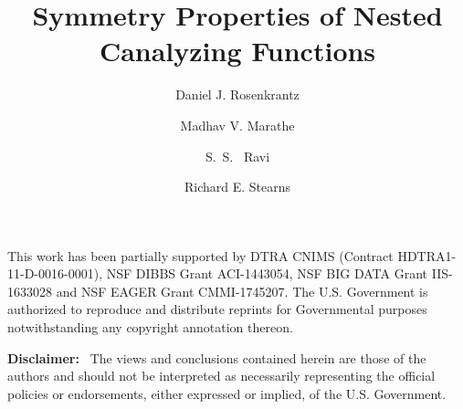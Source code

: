 \documentclass[
submission
]{dmtcs-episciences}
\author{Daniel J. Rosenkrantz\affiliationmark{1}
  \and Madhav V. Marathe\affiliationmark{2}%
  \and S.~S.~ Ravi\affiliationmark{1}%
  \and Richard E. Stearns\affiliationmark{1}
}
\title[Symmetry and NCFs]
      {Symmetry Properties of Nested Canalyzing Functions}
\affiliation{
  Biocomplexity Institute and Initiative, University of Virginia and
  Department of Computer Science, University at Albany 
  -- State University of New York, USA\\
  Biocomplexity Institute and Initiative \& Department of 
  Computer Science, University of Virginia, USA
}
\begin{document}
\maketitle




\newcommand{\QED}{\hfill\rule{2mm}{2mm}}

\newcommand{\cpoly}{\textbf{P}}
\newcommand{\cnp}{\textbf{NP}}
\newcommand{\cnump}{\textbf{\#P}}
\newcommand{\wtg}{\mbox{$\mathcal{G}$}}

\newcommand{\arr}{\mbox{$\:\longrightarrow\:$}}

\smallskip

\begin{abstract}

\end{abstract}






\acknowledgments
This work has been partially supported by
DTRA CNIMS (Contract HDTRA1-11-D-0016-0001),
NSF DIBBS Grant ACI-1443054, 
NSF BIG DATA Grant IIS-1633028 and
NSF EAGER Grant CMMI-1745207.
The U.S. Government is authorized to reproduce and
distribute reprints for Governmental purposes notwithstanding
any copyright annotation thereon.

\bigskip%

\medskip

\noindent
\textbf{Disclaimer:}~ The views and conclusions contained
herein are those of the authors and should
not be interpreted as necessarily representing the
official policies or endorsements, either expressed
or implied, of the U.S. Government.



%

\end{document}
